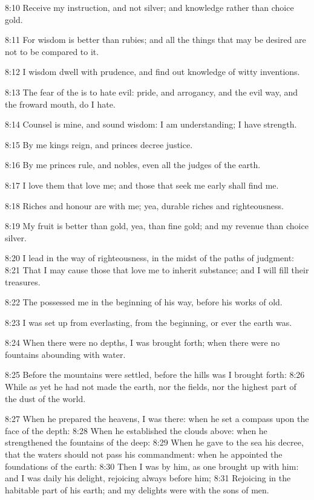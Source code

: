 8:10 Receive my instruction, and not silver; and knowledge rather than
choice gold.

8:11 For wisdom is better than rubies; and all the things that may be
desired are not to be compared to it.

8:12 I wisdom dwell with prudence, and find out knowledge of witty
inventions.

8:13 The fear of the \LORD is to hate evil: pride, and arrogancy, and
the evil way, and the froward mouth, do I hate.

8:14 Counsel is mine, and sound wisdom: I am understanding; I have
strength.

8:15 By me kings reign, and princes decree justice.

8:16 By me princes rule, and nobles, even all the judges of the earth.

8:17 I love them that love me; and those that seek me early shall find
me.

8:18 Riches and honour are with me; yea, durable riches and
righteousness.

8:19 My fruit is better than gold, yea, than fine gold; and my revenue
than choice silver.

8:20 I lead in the way of righteousness, in the midst of the paths of
judgment: 8:21 That I may cause those that love me to inherit
substance; and I will fill their treasures.

8:22 The \LORD possessed me in the beginning of his way, before his
works of old.

8:23 I was set up from everlasting, from the beginning, or ever the
earth was.

8:24 When there were no depths, I was brought forth; when there were
no fountains abounding with water.

8:25 Before the mountains were settled, before the hills was I brought
forth: 8:26 While as yet he had not made the earth, nor the fields,
nor the highest part of the dust of the world.

8:27 When he prepared the heavens, I was there: when he set a compass
upon the face of the depth: 8:28 When he established the clouds above:
when he strengthened the fountains of the deep: 8:29 When he gave to
the sea his decree, that the waters should not pass his commandment:
when he appointed the foundations of the earth: 8:30 Then I was by
him, as one brought up with him: and I was daily his delight,
rejoicing always before him; 8:31 Rejoicing in the habitable part of
his earth; and my delights were with the sons of men.

